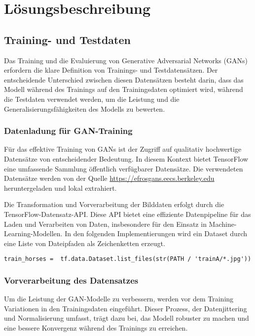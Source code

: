 \chapter{Lösungsbeschreibung}
\section{Training- und Testdaten}
Das Training und die Evaluierung von Generative Adversarial Networks (GANs) erfordern die klare Definition von Trainings- und Testdatensätzen. Der entscheidende Unterschied zwischen diesen Datensätzen besteht darin, dass das Modell während des Trainings auf den Trainingsdaten optimiert wird, während die Testdaten verwendet werden, um die Leistung und die Generalisierungsfähigkeiten des Modells zu bewerten.

\subsection{Datenladung für GAN-Training}
Für das effektive Training von GANs ist der Zugriff auf qualitativ hochwertige Datensätze von entscheidender Bedeutung. In diesem Kontext bietet TensorFlow eine umfassende Sammlung öffentlich verfügbarer Datensätze. Die verwendeten Datensätze werden von der Quelle \url{https://efrosgans.eecs.berkeley.edu} heruntergeladen und lokal extrahiert.



Die Transformation und Vorverarbeitung der Bilddaten erfolgt durch die TensorFlow-Datensatz-API. Diese API bietet eine effiziente Datenpipeline für das Laden und Verarbeiten von Daten, insbesondere für den Einsatz in Machine-Learning-Modellen. In den folgenden Implementierungen wird ein Dataset durch eine Liste von Dateipfaden als Zeichenketten erzeugt.

\begin{lstlisting}[language=pyhaff, caption={Erzeugung eines Tensorflow-Dataset aus CycleGAN Implementierung}, label={cod:createDataset}]
train_horses =  tf.data.Dataset.list_files(str(PATH / 'trainA/*.jpg')) 
\end{lstlisting}

\subsection{Vorverarbeitung des Datensatzes}
Um die Leistung der GAN-Modelle zu verbessern, werden vor dem Training Variationen in den Trainingsdaten eingeführt. Dieser Prozess, der Datenjittering und Normalisierung umfasst, trägt dazu bei, das Modell robuster zu machen und eine bessere Konvergenz während des Trainings zu erreichen.

